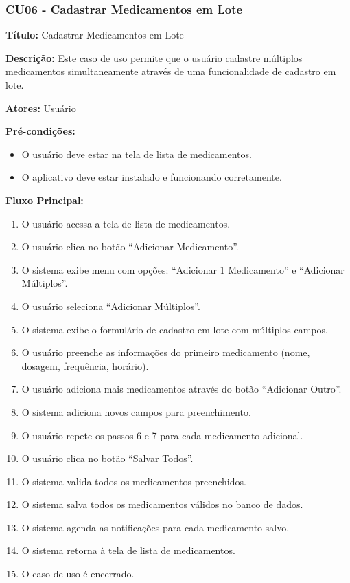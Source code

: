 \documentclass[12pt]{article}
\begin{document}
\subsubsection{CU06 - Cadastrar Medicamentos em Lote}

\textbf{Título:} Cadastrar Medicamentos em Lote

\textbf{Descrição:} Este caso de uso permite que o usuário cadastre múltiplos medicamentos simultaneamente através de uma funcionalidade de cadastro em lote.

\textbf{Atores:} Usuário

\textbf{Pré-condições:}
\begin{itemize}
    \item O usuário deve estar na tela de lista de medicamentos.
    \item O aplicativo deve estar instalado e funcionando corretamente.
\end{itemize}

\textbf{Fluxo Principal:}
\begin{enumerate}
    \item O usuário acessa a tela de lista de medicamentos.
    \item O usuário clica no botão ``Adicionar Medicamento''.
    \item O sistema exibe menu com opções: ``Adicionar 1 Medicamento'' e ``Adicionar Múltiplos''.
    \item O usuário seleciona ``Adicionar Múltiplos''.
    \item O sistema exibe o formulário de cadastro em lote com múltiplos campos.
    \item O usuário preenche as informações do primeiro medicamento (nome, dosagem, frequência, horário).
    \item O usuário adiciona mais medicamentos através do botão ``Adicionar Outro''.
    \item O sistema adiciona novos campos para preenchimento.
    \item O usuário repete os passos 6 e 7 para cada medicamento adicional.
    \item O usuário clica no botão ``Salvar Todos''.
    \item O sistema valida todos os medicamentos preenchidos.
    \item O sistema salva todos os medicamentos válidos no banco de dados.
    \item O sistema agenda as notificações para cada medicamento salvo.
    \item O sistema retorna à tela de lista de medicamentos.
    \item O caso de uso é encerrado.
\end{enumerate}
\end{document}
